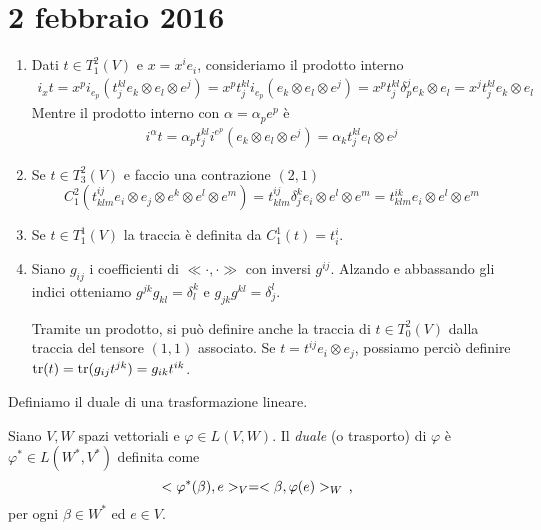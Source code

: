 \chapter{2 febbraio 2016}

\begin{example}
	\begin{enumerate}
		\item Dati $t\in T_1^2(V)$ e $x=x^ie_i$, consideriamo il prodotto interno 
		\begin{align*}
		i_xt = x^pi_{e_p}(t_j^{kl} e_k\otimes e_l\otimes e^j) = x^p t_j^{kl}i_{e_p} (e_k\otimes e_l\otimes e^j) = x^pt_j^{kl}\delta_p^j e_k\otimes e_l = x^j t_j^{kl} e_k\otimes e_l
		\end{align*}
		Mentre il prodotto interno con $\alpha = \alpha_pe^p$ è
		\begin{align*}
		i^\alpha t = \alpha_p t_j^{kl} i^{e^p}(e_k\otimes e_l\otimes e^j) = \alpha_k t_j^{kl} e_l\otimes e^j
		\end{align*}
		
		\item Se $t\in T_3^2(V)$ e faccio una contrazione $(2,1)$
		\begin{equation*}
			C_1^2 (t_{klm}^{ij} e_i\otimes e_j\otimes e^k\otimes e^l\otimes e^m ) = t_{klm}^{ij} \delta_j^k e_i\otimes e^l\otimes e^m = t_{klm}^{ik} e_i\otimes e^l\otimes e^m
		\end{equation*}
		
		\item Se $t\in T_1^1(V)$ la traccia è definita da $C_1^1(t) = t_i^i$.

		\item Siano $g_{ij}$ i coefficienti di $\ll \cdot, \cdot \gg$ con inversi $g^{ij}$. Alzando e abbassando gli indici otteniamo $g^{jk}g_{kl} = \delta_l^k$ e $g_{jk}g^{kl} = \delta_j^l$.
		
		Tramite un prodotto, si può definire anche la traccia di $t\in T_0^2(V)$ dalla traccia del tensore $(1,1)$ associato. Se $t=t^{ij}e_i\otimes e_j$, possiamo perciò definire $\operatorname{tr} (t) = \operatorname{tr} (g_{ij}t^{jk}) = g_{ik}t^{ik}$.
	\end{enumerate}
\end{example}

Definiamo il duale di una trasformazione lineare.
\begin{definition}
	Siano $V,W$ spazi vettoriali e $\varphi \in L(V,W)$. Il \emph{duale} (o trasporto) di $\varphi$ è $\varphi^* \in L(W^*,V^*)$ definita come 
	\begin{equation*} %
		<\varphi^*(\beta), e>_V = < \beta, \varphi(e) >_W \virgola 
	\end{equation*}
	per ogni $\beta \in W^*$ ed $e\in V$.
\end{definition}

